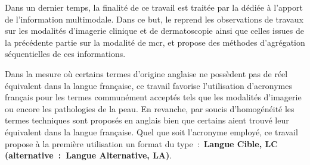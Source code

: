 Dans un dernier temps, la finalité de ce travail est traitée par la  dédiée à l'apport de l'information multimodale. Dans ce but, le  reprend les observations de travaux sur les modalités d'imagerie clinique et de dermatoscopie ainsi que celles issues de la précédente partie sur la modalité de \gls{mcr}, et propose des méthodes d'agrégation séquentielles de ces informations.\par

Dans la mesure où certains termes d'origine anglaise ne possèdent pas de réel équivalent dans la langue française, ce travail favorise l'utilisation d'acronymes français pour les termes communément acceptés tels que les modalités d'imagerie ou encore les pathologies de la peau. En revanche, par soucis d'homogénéité les termes techniques sont proposés en anglais bien que certains aient trouvé leur équivalent dans la langue française. Quel que soit l’acronyme employé, ce travail propose à la première utilisation un format du type~:~\textbf{Langue Cible, LC (alternative~:~Langue Alternative, LA)}.\par